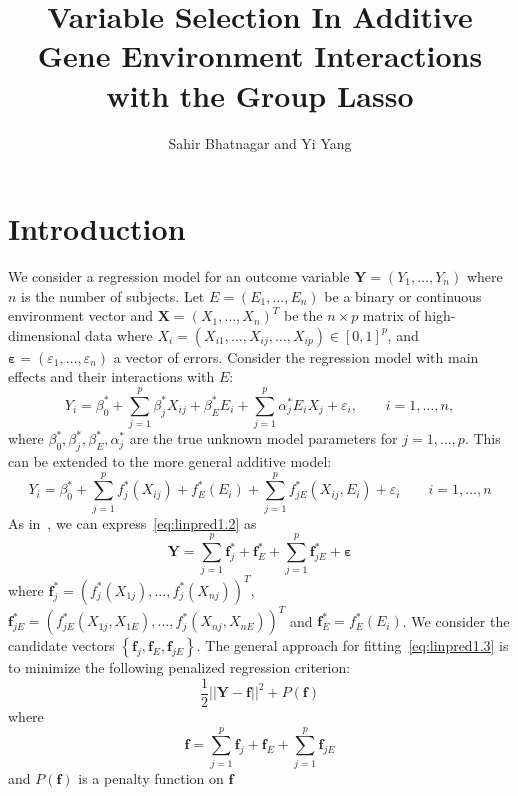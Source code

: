 \documentclass[12pt,letter]{article}
\title{Variable Selection In Additive Gene Environment Interactions with the Group Lasso}
\author{Sahir Bhatnagar and Yi Yang}
\newcommand {\bs}{\boldsymbol}
\newcommand{\mb}[1]{\mathbf{#1}}
\newcommand{\bx}{\mathbf{X}}
\begin{document}
\newpage
\pagestyle{fancy}

\maketitle
\section{Introduction}



We consider a regression model for an outcome variable $\mathbf{Y}=(Y_1, \ldots, Y_n)$ where $n$ is the number of subjects. 
Let $E=(E_1, \ldots, E_n)$ be a binary or continuous environment vector and \mbox{$\bx = (X_{1}, \ldots, X_{n})^T$} be the $n \times p$ matrix of high-dimensional data where $X_i = (X_{i1}, \ldots,X_{ij}, \ldots,  X_{ip}) \in [0,1]^p$, and $\bs{\varepsilon} = (\varepsilon_1, \ldots, \varepsilon_n)$ a vector of errors. 
Consider the regression model with main effects and their interactions with $E$:
\begin{equation}  
Y_i = \beta^*_0 + \sum_{j=1}^p \beta^*_j X_{ij} + \beta^*_E E_i + \sum_{j=1}^p \alpha^*_j E_i X_j + \varepsilon_i, \qquad i=1, \ldots, n \label{eq:linpred1.1},
\end{equation}
where $\beta^*_0,\beta^*_j,\beta^*_E,\alpha^*_j$ are the true unknown model parameters for $j=1, \ldots, p$. 
This can be extended to the more general additive model:
\begin{equation}  
Y_i = \beta^*_0 + \sum_{j=1}^p f^*_j (X_{ij}) + f_E^*(E_i) + \sum_{j=1}^p f^*_{jE} (X_{ij},E_i) + \varepsilon_i \qquad i=1, \ldots, n \label{eq:linpred1.2}
\end{equation}
As in~\citep{radchenko2010variable}, we can express~\eqref{eq:linpred1.2} as 
\begin{equation}
\mb{Y} =  \sum_{j=1}^p \mb{f}^*_j + \mb{f}_E^* + \sum_{j=1}^p \mb{f}^*_{jE} + \bs{\varepsilon} \label{eq:linpred1.3}
\end{equation}
where $\mb{f}^*_j = \left(f_j^*(X_{1j}), \ldots, f_j^*(X_{nj})\right)^T$, $\mb{f}^*_{jE} = \left(f_{jE}^*(X_{1j},X_{1E}), \ldots, f_j^*(X_{nj}, X_{nE})\right)^T$ and \mbox{$\mb{f}_E^* = f_E^*(E_i)$}. 
We consider the candidate vectors $\left\lbrace \mb{f}_j,\mb{f}_E, \mb{f}_{jE}\right\rbrace$. The general approach for fitting~\eqref{eq:linpred1.3} is to minimize the following penalized regression criterion:
\begin{equation}
\frac{1}{2} \lvert\lvert \mb{Y} - \mb{f} \rvert\rvert^2 + P(\mb{f})
\end{equation}
where 
\begin{equation}
\mb{f} = \sum_{j=1}^p \mb{f}_j + \mb{f}_E + \sum_{j=1}^p \mb{f}_{jE}
\end{equation}
and $P(\mb{f})$ is a penalty function on $\mb{f}$
\end{document}
